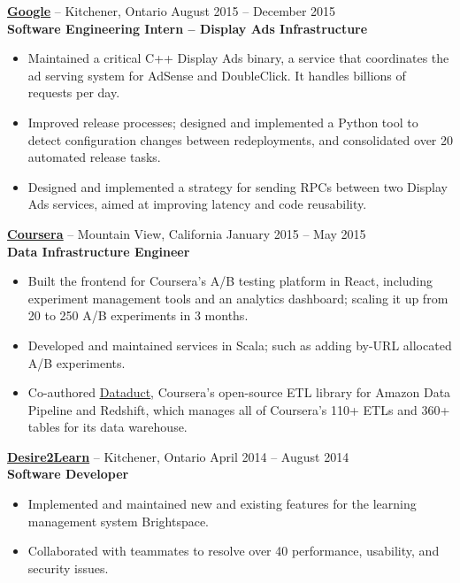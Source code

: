 \documentclass{letter}
\begin{document}
\vspace{-1.5mm}
{\bfseries \href{https://www.google.com}{\uline{Google}}} -- Kitchener, Ontario \hfill August 2015 -- December 2015\\
{\bfseries Software Engineering Intern -- Display Ads Infrastructure}
\vspace{-3mm}
\begin{itemize}
    \item Maintained a critical C++ Display Ads binary, a service that
      coordinates the ad serving system for AdSense and DoubleClick. It handles
      billions of requests per day.
    \item Improved release processes; designed and implemented a Python tool to
        detect configuration changes between redeployments, and consolidated
        over 20 automated release tasks.
    \item Designed and implemented a strategy for sending RPCs between two
      Display Ads services, aimed at improving latency and code reusability.
\end{itemize}

\vspace{-1.5mm}
{\bfseries \href{https://www.coursera.org}{\uline{Coursera}}} -- Mountain View, California \hfill January 2015 -- May 2015 \\
{\bfseries Data Infrastructure Engineer}
\vspace{-3mm}
\begin{itemize}
    \item Built the frontend for Coursera's A/B testing platform in React, including
      experiment management tools and an analytics dashboard; scaling it up from 20 to
      250 A/B experiments in 3 months.
    \item Developed and maintained services in Scala; such as adding by-URL
      allocated A/B experiments.
    \item Co-authored \href{https://github.com/coursera/dataduct}{\uline{Dataduct}},
      Coursera's open-source ETL library for Amazon Data Pipeline and
      Redshift, which manages all of Coursera's 110+ ETLs and 360+ tables for its data warehouse.
\end{itemize}

\vspace{-1.5mm}
{\bfseries \href{http://www.d2l.com}{\uline{Desire2Learn}}} -- Kitchener, Ontario \hfill April 2014 -- August 2014 \\
{\bfseries Software Developer}
\vspace{-3mm}
\begin{itemize}
    \item Implemented and maintained new and existing features for the learning
      management system Brightspace.
    \item Collaborated with teammates to resolve over 40 performance, usability, and security issues.
\end{itemize}
\end{document}
